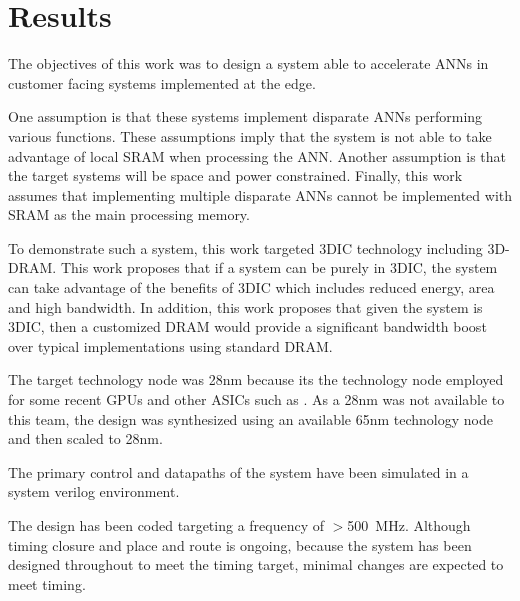 \documentclass[journal]{IEEEtran}
\begin{document}
\section{Results}
\label{sec:Results}
The objectives of this work was to design a system able to accelerate ANNs in customer facing systems implemented at the edge. 

One assumption is that these systems implement disparate ANNs performing various functions. These assumptions imply that the system is not able to take advantage of local SRAM when processing the ANN.
Another assumption is that the target systems will be space and power constrained.
Finally, this work assumes that implementing multiple disparate ANNs cannot be implemented with SRAM as the main processing memory.

To demonstrate such a system, this work targeted 3DIC technology including 3D-DRAM. This work proposes that if a system can be purely in 3DIC, the system can take advantage of the benefits
of 3DIC which includes reduced energy, area and high bandwidth.
In addition, this work proposes that given the system is 3DIC, then a customized DRAM would provide a significant bandwidth boost over typical implementations using standard DRAM.

The target technology node was 28nm because its the technology node employed for some recent GPUs and other ASICs such as \cite{jouppi2017datacenter}.
As a 28nm was not available to this team, the design was synthesized using an available 65nm technology node and then scaled to 28nm.

The primary control and datapaths of the system have been simulated in a system verilog environment. 

The design has been coded targeting a frequency of $>$\SI{500}{\mega\hertz}. 
Although timing closure and place and route is ongoing, because the system has been designed throughout to meet the timing target, minimal changes are expected to meet timing.

\end{document}
